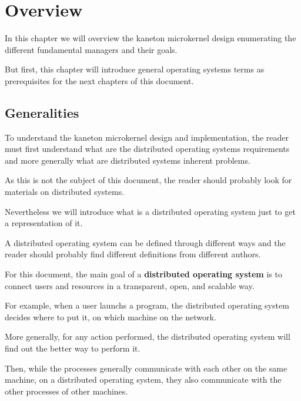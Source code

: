 
%
%

\chapter{Overview}

In this chapter we will overview the kaneton microkernel design enumerating
the different fundamental managers and their goals.

But first, this chapter will introduce general operating systems
terms as prerequisites for the next chapters of this document.

\newpage

%
%

\section{Generalities}

To understand the kaneton microkernel design and implementation, the reader
must first understand what are the distributed operating systems requirements
and more generally what are distributed systems inherent problems.

As this is not the subject of this document, the reader should probably
look for materials on distributed systems.

Nevertheless we will introduce what is a distributed operating system
just to get a representation of it.

A distributed operating system can be defined through different ways and
the reader should probably find different definitions from different
authors.

For this document, the main goal of a \textbf{distributed operating system}
is to connect users and resources in a transparent, open, and scalable way.

For example, when a user launchs a program, the distributed operating system
decides where to put it, on which machine on the network.

More generally, for any action performed, the distributed operating system
will find out the better way to perform it.

Then, while the processes generally communicate with each other on the same
machine, on a distributed operating system, they also communicate with the
other processes of other machines.

